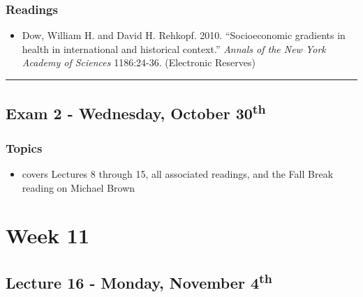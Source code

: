 \documentclass[]{book}
\providecommand{\tightlist}{%
  \setlength{\itemsep}{0pt}\setlength{\parskip}{0pt}}
\begin{document}
\hypertarget{readings-17}{%
\subsubsection*{Readings}\label{readings-17}}

\begin{itemize}
\tightlist
\item
  Dow, William H. and David H. Rehkopf. 2010. ``Socioeconomic gradients in health in international and historical context.'' \emph{Annals of the New York Academy of Sciences} 1186:24-36. (Electronic Reserves)
\end{itemize}

\begin{center}\rule{0.5\linewidth}{\linethickness}\end{center}

\hypertarget{exam-2---wednesday-october-30th}{%
\subsection*{\texorpdfstring{Exam 2 - Wednesday, October 30\textsuperscript{th}}{Exam 2 - Wednesday, October 30th}}\label{exam-2---wednesday-october-30th}}

\hypertarget{topics-19}{%
\subsubsection*{Topics}\label{topics-19}}

\begin{itemize}
\tightlist
\item
  covers Lectures 8 through 15, all associated readings, and the Fall Break reading on Michael Brown
\end{itemize}

\hypertarget{week-11}{%
\section*{Week 11}\label{week-11}}

\hypertarget{lecture-16---monday-november-4th}{%
\subsection*{\texorpdfstring{Lecture 16 - Monday, November 4\textsuperscript{th}}{Lecture 16 - Monday, November 4th}}\label{lecture-16---monday-november-4th}}
\end{document}
